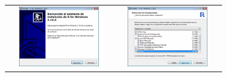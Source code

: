 \documentclass[
]{book}
\begin{document}
\begin{longtable}[]{@{}cc@{}}
\toprule\noalign{}
\endhead
\bottomrule\noalign{}
\endlastfoot
\includegraphics[width=0.8\textwidth,height=\textheight]{images/image3.png} & \includegraphics[width=0.8\textwidth,height=\textheight]{images/image4.png} \\

\end{longtable}
\end{document}

